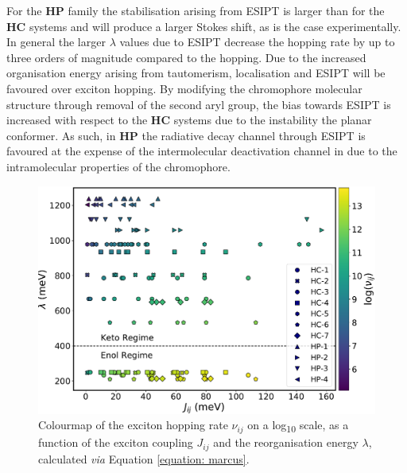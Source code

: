 For the \textbf{HP} family the stabilisation arising from ESIPT is larger than for the \textbf{HC} systems and will produce a larger Stokes shift, as is the case experimentally. In general the larger $\lambda$ values due to ESIPT decrease the hopping rate by up to three orders of magnitude compared to the \Estar{} hopping. Due to the increased organisation energy arising from tautomerism, localisation and ESIPT will be favoured over exciton hopping. By modifying the chromophore molecular structure through removal of the second aryl group, the bias towards ESIPT is increased with respect to the \textbf{HC} systems due to the instability the planar \Estar{} conformer. As such, in \textbf{HP} the radiative decay channel through ESIPT is favoured at the expense of the intermolecular deactivation channel in \Estar{} due to the intramolecular properties of the chromophore. 
\begin{figure}
\centering
  \includegraphics[width=0.8\linewidth]{5ConnectingCrystalStructure/marcus_3dscatter_vdw.pdf}
  \caption[Exciton hopping rates]{Colourmap of the exciton hopping rate $\nu_{ij}$ on a log\textsubscript{10} scale, as a function of the exciton coupling $J_{ij}$ and the reorganisation energy $\lambda$, calculated \textit{via} Equation \ref{equation: marcus}.}
  \label{figure: marcus_scatter_vdw}
\end{figure}

